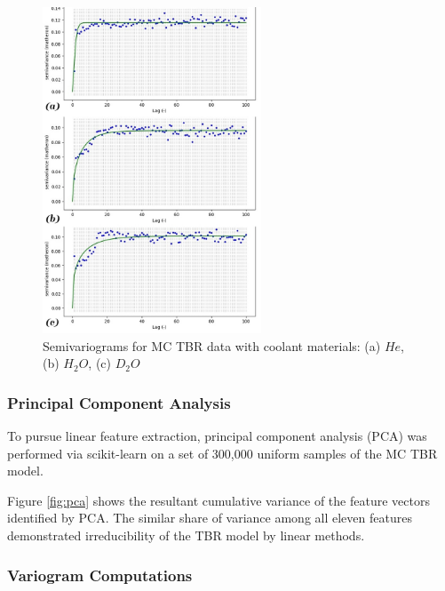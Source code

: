 \begin{figure}
  \vspace{-55pt}
  \begin{center}
    \hspace*{-.3\columnsep}\includegraphics[width=0.58\textwidth]{fig3_allvar.jpg}
    \caption{Semivariograms for MC TBR data with coolant materials: (a) $He$, (b) $H_2O$, (c) $D_2O$}
    \label{fig:var}
  \end{center}
  \vspace{-110pt}
\end{figure}

\subsubsection{Principal Component Analysis}

To pursue linear feature extraction, principal component analysis (PCA) was performed via scikit-learn on a set of 300,000 uniform samples of the MC TBR model. 

Figure \ref{fig:pca} shows the resultant cumulative variance of the feature vectors identified by PCA. The similar share of variance among all eleven features demonstrated irreducibility of the TBR model by linear methods.

\subsubsection{Variogram Computations}

